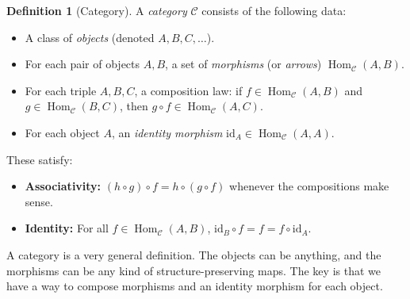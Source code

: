 \documentclass[11pt]{article}
\theoremstyle{definition}
\newtheorem{definition}{Definition}[section]
\theoremstyle{plain}
\begin{document}
\begin{definition}[Category]
    A \emph{category} $\mathcal{C}$ consists of the following data:
    \begin{itemize}
        \item A class of \emph{objects} (denoted $A, B, C, \dots$).
        \item For each pair of objects $A, B$, a set of \emph{morphisms} (or \emph{arrows}) $\operatorname{Hom}_{\mathcal{C}}(A, B)$.
        \item For each triple $A, B, C$, a composition law: if $f \in \operatorname{Hom}_{\mathcal{C}}(A, B)$ and $g \in \operatorname{Hom}_{\mathcal{C}}(B, C)$, then $g \circ f \in \operatorname{Hom}_{\mathcal{C}}(A, C)$.
        \item For each object $A$, an \emph{identity morphism} $\mathrm{id}_A \in \operatorname{Hom}_{\mathcal{C}}(A, A)$.
    \end{itemize}
    These satisfy:
    \begin{itemize}
        \item \textbf{Associativity:} $(h \circ g) \circ f = h \circ (g \circ f)$ whenever the compositions make sense.
        \item \textbf{Identity:} For all $f \in \operatorname{Hom}_{\mathcal{C}}(A, B)$, $\mathrm{id}_B \circ f = f = f \circ \mathrm{id}_A$.
    \end{itemize}
\end{definition}


A category is a very general definition. The objects can be anything, and the morphisms can be any kind of structure-preserving maps. The key is that we have a way to compose morphisms and an identity morphism for each object.
\end{document}
